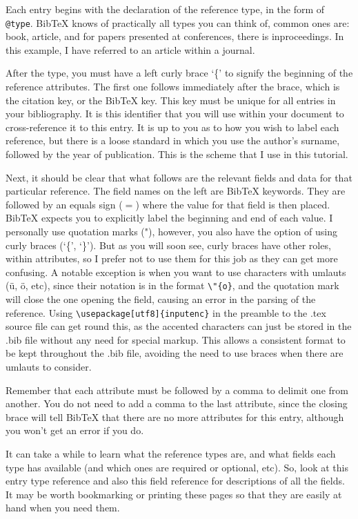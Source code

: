 \documentclass[english,ngerman,paper=a5,headsepline=true,9pt,DIV=12,BCOR=0.7cm]{scrbook}
\begin{document}
Each entry begins with the declaration of the reference type, in the
form of \verb|@type|. BibTeX knows of practically all types you can think of,
common ones are: book, article, and for papers presented at
conferences, there is inproceedings. In this example, I have referred
to an article within a journal.

After the type, you must have a left curly brace `\{' to signify the
beginning of the reference attributes. The first one follows
immediately after the brace, which is the citation key, or the BibTeX
key. This key must be unique for all entries in your bibliography. It
is this identifier that you will use within your document to
cross-reference it to this entry. It is up to you as to how you wish
to label each reference, but there is a loose standard in which you
use the author's surname, followed by the year of publication. This is
the scheme that I use in this tutorial.

Next, it should be clear that what follows are the relevant fields and
data for that particular reference. The field names on the left are
BibTeX keywords. They are followed by an equals sign ($=$) where the
value for that field is then placed. BibTeX expects you to explicitly
label the beginning and end of each value. I personally use quotation
marks ("), however, you also have the option of using curly braces
(`\{', `\}'). But as you will soon see, curly braces have other roles,
within attributes, so I prefer not to use them for this job as they
can get more confusing. A notable exception is when you want to use
characters with umlauts (ü, ö, etc), since their notation is in the
format \verb|\"{o}|, and the quotation mark will close the one
opening the field, causing an error in the parsing of the
reference. Using \verb|\usepackage[utf8]{inputenc}| in the
preamble to the .tex source file can get round this, as the accented
characters can just be stored in the .bib file without any need for
special markup. This allows a consistent format to be kept throughout
the .bib file, avoiding the need to use braces when there are umlauts
to consider.

Remember that each attribute must be followed by a comma to delimit
one from another. You do not need to add a comma to the last
attribute, since the closing brace will tell BibTeX that there are no
more attributes for this entry, although you won't get an error if you
do.

It can take a while to learn what the reference types are, and what
fields each type has available (and which ones are required or
optional, etc). So, look at this entry type reference and also this
field reference for descriptions of all the fields. It may be worth
bookmarking or printing these pages so that they are easily at hand
when you need them.
\end{document}

